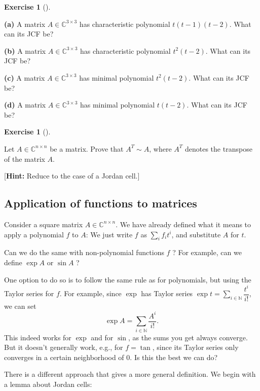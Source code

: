 \documentclass[numbers=enddot,12pt,final,onecolumn,notitlepage]{scrartcl}%
\newcounter{exer}
\numberwithin{exer}{subsection}
\theoremstyle{definition}
\newtheorem{exmp}[exer]{Exercise}
\newenvironment{exercise}[1][]
{\begin{exmp}[#1]\begin{leftbar}}
{\end{leftbar}\end{exmp}}
\let\sumnonlimits\sum
\renewcommand{\sum}{\sumnonlimits\limits}
\begin{document}
\begin{exercise}
 \textbf{(a)} A matrix $A\in\mathbb{C}^{3\times3}$ has characteristic
polynomial $t\left(  t-1\right)  \left(  t-2\right)  $. What can its JCF be?
\medskip

\textbf{(b)} A matrix $A\in\mathbb{C}^{3\times3}$ has characteristic
polynomial $t^{2}\left(  t-2\right)  $. What can its JCF be? \medskip

\textbf{(c)} A matrix $A\in\mathbb{C}^{3\times3}$ has minimal polynomial
$t^{2}\left(  t-2\right)  $. What can its JCF be? \medskip

\textbf{(d)} A matrix $A\in\mathbb{C}^{3\times3}$ has minimal polynomial
$t\left(  t-2\right)  $. What can its JCF be?
\end{exercise}

\begin{exercise}
 Let $A\in\mathbb{C}^{n\times n}$ be a matrix. Prove that $A^{T}\sim
A$, where $A^{T}$ denotes the transpose of the matrix $A$. \medskip

[\textbf{Hint:} Reduce to the case of a Jordan cell.]
\end{exercise}

\subsection{Application of functions to matrices}

Consider a square matrix $A\in\mathbb{C}^{n\times n}$. We have already defined
what it means to apply a polynomial $f$ to $A$: We just write $f$ as $\sum
_{i}f_{i}t^{i}$, and substitute $A$ for $t$.

Can we do the same with non-polynomial functions $f$ ? For example, can we
define $\exp A$ or $\sin A$ ?

One option to do so is to follow the same rule as for polynomials, but using
the Taylor series for $f$. For example, since $\exp$ has Taylor series $\exp
t=\sum_{i\in\mathbb{N}}\dfrac{t^{i}}{i!}$, we can set%
\[
\exp A=\sum_{i\in\mathbb{N}}\dfrac{A^{i}}{i!}.
\]
This indeed works for $\exp$ and for $\sin$, as the sums you get always
converge. But it doesn't generally work, e.g., for $f=\tan$, since its Taylor
series only converges in a certain neighborhood of $0$. Is this the best we
can do?

There is a different approach that gives a more general definition. We begin
with a lemma about Jordan cells:
\end{document}
